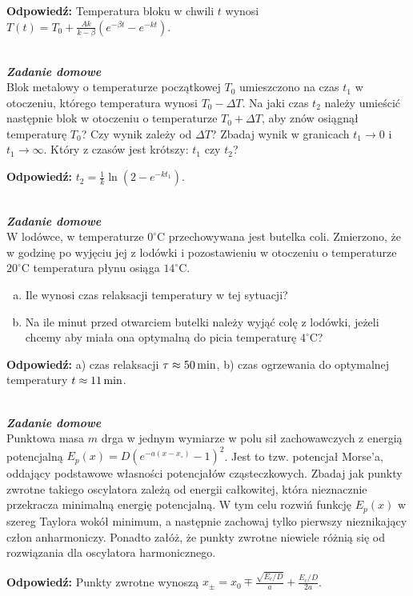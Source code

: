 \documentclass[11pt,a4paper]{article}
\newcounter{zaddom}\newcommand{\zaddom}[1][]{\addtocounter{zaddom}{1} ~\\  {\bf \emph{Zadanie domowe \arabic{zaddom} #1 }} \\}
\begin{document}
\vskip 10pt

\textbf{Odpowiedź:} Temperatura bloku w chwili $t$ wynosi $T(t) = T_0 + \frac{Ak}{k - \beta}\left(e^{-\beta t} - e^{-kt}\right)$.


\zaddom
Blok metalowy o temperaturze początkowej $T_0$ umieszczono na czas $t_1$ w otoczeniu,
którego temperatura wynosi $T_0-\Delta T$. Na jaki czas $t_2$ należy umieścić następnie blok
w otoczeniu o temperaturze $T_0+\Delta T$, aby znów osiągnął temperaturę $T_0$?
Czy wynik zależy od $\Delta T$? 
Zbadaj wynik w granicach $t_1\rightarrow 0$ i $t_1\rightarrow \infty$. 
Który z czasów jest krótszy: $t_1$ czy $t_2$?

\vskip 10pt

\textbf{Odpowiedź:} $t_2 = \frac{1}{k} \ln \left(2 - e^{-k t_1}\right)$. 

\zaddom
W lodówce, w temperaturze $0^\circ$C przechowywana jest butelka coli.
Zmierzono, że w godzinę po wyjęciu jej z lodówki i pozostawieniu w otoczeniu o
temperaturze $20^\circ$C temperatura płynu osiąga $14^\circ$C.
\begin{enumerate}[a)]
\item Ile wynosi czas relaksacji temperatury w tej sytuacji?
\item Na ile minut przed otwarciem butelki należy wyjąć colę z lodówki, jeżeli
chcemy aby miała ona optymalną do picia temperaturę $4^\circ$C?
\end{enumerate}

\vskip 10pt

\textbf{Odpowiedź:} a) czas relaksacji $\tau \approx 50\, {\rm min}$, b) czas ogrzewania do optymalnej temperatury $t \approx 11\, {\rm min}$. 


\zaddom 
Punktowa masa $m$ drga w jednym wymiarze w polu sił zachowawczych
z energią potencjalną  \linebreak \mbox{$E_p(x) = D \left(e^{-a(x-x_\circ)}-1\right)^2$.}
Jest to tzw. potencjał Morse’a, oddający podstawowe własności potencjałów cząsteczkowych.
Zbadaj jak punkty zwrotne takiego oscylatora zależą od energii całkowitej, która nieznacznie
przekracza minimalną energię potencjalną. W tym celu rozwiń funkcję $E_p(x)$
w szereg Taylora wokół minimum, a następnie zachowaj tylko pierwszy nieznikający człon anharmoniczy. 
Ponadto załóż, że punkty zwrotne niewiele różnią się od rozwiązania dla oscylatora harmonicznego.

\vskip 10pt

\textbf{Odpowiedź:} Punkty zwrotne wynoszą $x_{\pm} = x_0 \mp \frac{\sqrt{E_c/D}}{a} + \frac{E_c/D}{2a}$. 
\end{document}

